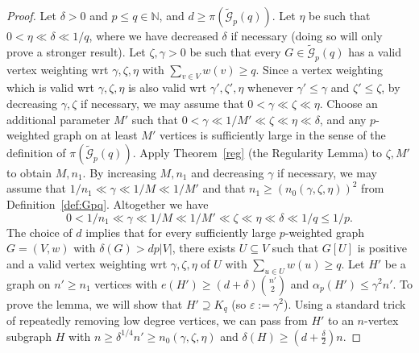 \documentclass[10pt,a4paper]{article}
\theoremstyle{definition}
\def\de{{\delta}}
\def\eps{{\varepsilon}}
\newcommand{\cG}{\mathcal{G}}
\begin{document}
\begin{proof}
	Let $\delta>0$ and $p \leq q \in \mathbb{N}$, and $d\ge \pi(\widetilde{\cG}_p(q))$. Let $\eta$ be such that $0 < \eta \ll \delta \ll 1/q$, where we have decreased $\delta$ if necessary (doing so will only prove a stronger result). 
	Let $\zeta,\gamma>0$ be such that every $G \in \widetilde{\cG}_p(q)$ has a valid vertex weighting wrt $\gamma,\zeta,\eta$ with $\sum_{v \in V}w(v) \geq q$.
	Since a vertex weighting which is valid wrt $\gamma,\zeta,\eta$ is also valid wrt $\gamma',\zeta',\eta$ whenever $\gamma' \leq \gamma$ and $\zeta' \leq \zeta$, by decreasing $\gamma,\zeta$ if necessary, we may assume that $0 < \gamma \ll \zeta \ll \eta$.
	Choose an additional parameter $M'$ such that
	$0 < \gamma \ll 1/M' \ll \zeta \ll \eta \ll \delta$, and any $p$-weighted graph on at least $M'$ vertices is sufficiently large in the sense of the definition of $\pi(\widetilde{\cG}_p(q))$.
	Apply Theorem~\ref{reg} (the Regularity Lemma) to $\zeta,M'$ to obtain $M,n_1$.
	By increasing $M,n_1$ and decreasing $\gamma$ if necessary, we may assume that $1/n_1 \ll \gamma \ll 1/M \ll 1/M'$
	and that $n_1 \geq (n_0(\gamma,\zeta,\eta))^2$ from Definition~\ref{def:Gpq}.
	Altogether we have
	$$
	0 < 1/n_1 \ll \gamma \ll 1/M \ll 1/M' \ll \zeta \ll \eta \ll \delta \ll 1/q \leq 1/p.
	$$
	The choice of $d$ implies that for every sufficiently large $p$-weighted graph $G=(V,w)$ with $\delta(G)>dp|V|$, there exists $U \subseteq V$ such that $G[U]$ is positive and a valid vertex weighting wrt $\gamma,\zeta,\eta$ of $U$ with $\sum_{u \in U}w(u) \geq q$.
	Let $H'$ be a graph on $n' \geq n_1$ vertices with $e(H') \geq (d+\delta)\binom{n'}{2}$ and  $\alpha_p(H')\le \gamma^2 n'$. To prove the lemma, we will show that $H' \supseteq K_{q}$ (so $\eps:=\gamma^2$). Using a standard trick of repeatedly removing low degree vertices, we can pass from $H'$ to an $n$-vertex subgraph $H$ with $n\ge \de^{1/4}n'\ge n_0(\gamma,\zeta,\eta)$ and $\de(H)\ge (d+\frac{\de}{2})n$.
	

\end{proof}
\end{document}
